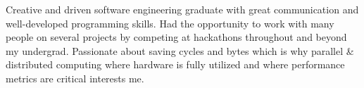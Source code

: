 
\begin{cvparagraph}
Creative and driven software engineering graduate with great communication and well-developed programming skills. 
Had the opportunity to work with many people on several projects by competing at hackathons throughout and beyond my undergrad.
Passionate about saving cycles and bytes which is why parallel \& distributed computing where hardware is fully utilized and where performance metrics are critical interests me.
\end{cvparagraph}